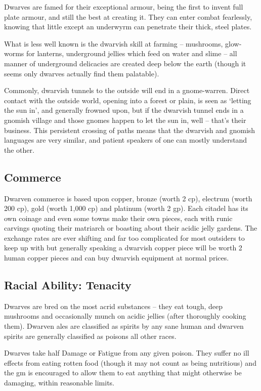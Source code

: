 \begin{multicols}{2}
Dwarves are famed for their exceptional armour, being the first to invent full plate armour, and still the best at creating it. They can enter combat fearlessly, knowing that little except an underwyrm can penetrate their thick, steel plates.

What is less well known is the dwarvish skill at farming -- mushrooms, glow-worms for lanterns, underground jellies which feed on water and slime -- all manner of underground delicacies are created deep below the earth (though it seems only dwarves actually find them palatable).

Commonly, dwarvish tunnels to the outside will end in a gnome-warren. Direct contact with the outside world, opening into a forest or plain, is seen as `letting the sun in', and generally frowned upon, but if the dwarvish tunnel ends in a gnomish village and those gnomes happen to let the sun in, well -- that's their business.
This persistent crossing of paths means that the dwarvish and gnomish languages are very similar, and patient speakers of one can mostly understand the other.

\subsection{Commerce}

Dwarven commerce is based upon copper, bronze (worth 2 cp), electrum (worth 200 cp), gold (worth 1,000 cp) and platinum (worth 2 gp).
Each citadel has its own coinage and even some towns make their own pieces, each with runic carvings quoting their matriarch or boasting about their acidic jelly gardens.
The exchange rates are ever shifting and far too complicated for most outsiders to keep up with but generally speaking a dwarvish copper piece will be worth 2 human copper pieces and can buy dwarvish equipment at normal prices.

\subsection{Racial Ability: Tenacity}

Dwarves are bred on the most acrid substances -- they eat tough, deep mushrooms and occasionally munch on acidic jellies (after thoroughly cooking them).
Dwarven ales are classified as spirits by any sane human and dwarven spirits are generally classified as poisons all other races.

Dwarves take half Damage or Fatigue from any given poison. They suffer no ill effects from eating rotten food (though it may not count as being nutritious) and the \gls{gm} is encouraged to allow them to eat anything that might otherwise be damaging, within reasonable limits.


\end{multicols}
